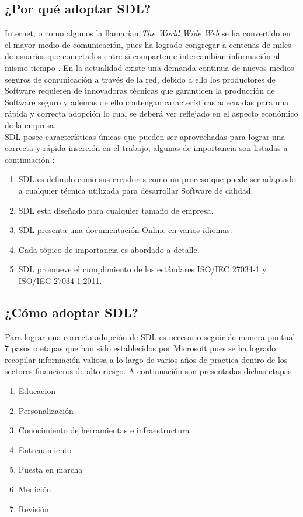 \documentclass[runningheads,a4paper]{llncs}
\begin{document}
\subsection{¿Por qué adoptar \gls{SDL}?}
Internet, o como algunos la llamarían \textit{The World Wide Web} se ha convertido en el mayor medio de comunicación, pues ha logrado congregar a centenas de miles de usuarios que conectados entre si comparten e intercambian información al mismo tiempo \cite{webAplicationSecurity}. En la actualidad existe una demanda continua de nuevos medios seguros de comunicación a través de la red, debido a ello los productores de Software requieren de innovadoras técnicas que garanticen la producción de Software seguro y ademas de ello contengan características adecuadas para una rápida y correcta adopción lo cual se deberá ver reflejado en el aspecto económico de la empresa. \\

\gls{SDL} posee características únicas que pueden ser aprovechadas para lograr una correcta y rápida inserción en el trabajo, algunas de importancia son listadas a continuación \cite{webAplicationSecurity}: 
\begin{enumerate}
	\item \gls{SDL} es definido como sus creadores como un proceso que puede ser adaptado a cualquier técnica utilizada para desarrollar Software de calidad.
	\item  \gls{SDL} esta diseñado para cualquier tamaño de empresa.
	\item \gls{SDL} presenta una documentación \gls{Online} en varios idiomas.
	\item  Cada tópico de importancia es abordado a detalle.
	\item  \gls{SDL} promueve el cumplimiento de los estándares ISO/IEC 27034-1 y ISO/IEC 27034-1:2011.
\end{enumerate}

\subsection{¿Cómo adoptar \gls{SDL}?}
Para lograr una correcta adopción de \gls{SDL} es necesario seguir de manera puntual 7 pasos o etapas que han sido establecidos por Microsoft pues se ha logrado recopilar información valiosa a lo largo de varios años de practica dentro de los sectores financieros de alto riesgo. A continuación son presentadas dichas etapas \cite{SDLWhitePaper}: 

\begin{enumerate}
\item Educacion 
\item Personalización 
\item Conocimiento de herramientas e infraestructura 
\item Entrenamiento 
\item Puesta en marcha 
\item Medición 
\item Revisión 
\end{enumerate}
\end{document}
